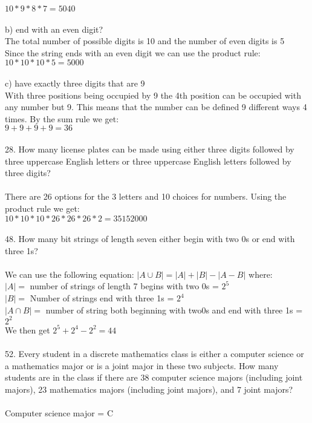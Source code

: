\documentclass[11pt, oneside]{article}   	%
\begin{document}
$10 * 9 * 8 * 7 = 5040$\\\\
b) end with an even digit?\\
The total number of possible digits is 10 and the number of even digits is 5\\
Since the string ends with an even digit we can use the product rule:\\
$10 * 10 * 10 * 5 = 5000$\\\\
c) have exactly three digits that are 9\\
With three positions being occupied by 9 the 4th position can be occupied with any number but 9. This means that the number can be defined 9 different ways 4 times. By the sum rule we get:\\
$9 + 9+ 9 + 9 = 36$\\\\
28. How many license plates can be made using either three digits followed by three uppercase English letters or three uppercase English letters followed by three digits?\\\\
There are 26 options for the 3 letters and 10 choices for numbers. Using the product rule we get:\\
$10 * 10 * 10 * 26 * 26 * 26 * 2 = 35152000$\\\\
48. How many bit strings of length seven either begin with two 0s or end with three 1s?\\\\
We can use the following equation: $|A\cup B| = |A| + |B| - |A - B|$ where:\\
$|A| =$ number of strings of length 7 begins with two 0s = $2^5$\\
$|B| =$ Number of strings end with three 1s = $2^4$\\
$|A\cap B| =$ number of string both beginning with two0s and end with three 1s = $2^2$\\
We then get $2^5 + 2^4 - 2^2 = 44$\\\\
52. Every student in a discrete mathematics class is either a computer science or a mathematics major or is a joint major in these two subjects. How many students are in the class if there are 38 computer science majors (including joint majors), 23 mathematics majors (including joint majors), and 7 joint majors?\\\\
Computer science major = C\\
\end{document}
